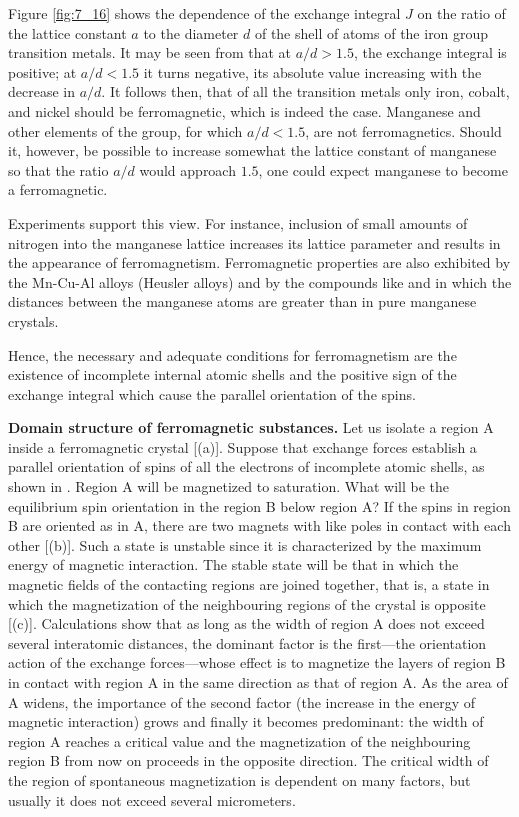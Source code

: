 Figure \ref{fig:7_16} shows the dependence of the exchange integral $J$ on the ratio of the lattice constant $a$ to the diameter $d$ of the  shell of atoms of the iron group transition metals. It may be seen from  that at $a/d>1.5$, the exchange integral is positive; at $a/d<1.5$ it turns negative, its absolute value increasing with the decrease in $a/d$. It follows then, that of all the transition metals only iron, cobalt, and nickel should be ferromagnetic, which is indeed the case. Manganese and other elements of the group, for which $a/d<1.5$, are not ferromagnetics. Should it, however, be possible to increase somewhat the lattice constant of manganese so that the ratio $a/d$ would approach $1.5$, one could expect manganese to become a ferromagnetic.

Experiments support this view. For instance, inclusion of small amounts of nitrogen into the manganese lattice increases its lattice parameter and results in the appearance of ferromagnetism. Ferromagnetic properties are also exhibited by the Mn-Cu-Al alloys (Heusler alloys) and by the compounds like  and  in which the distances between the manganese atoms are greater than in pure manganese crystals.

Hence, the necessary and adequate conditions for ferromagnetism are the existence of incomplete internal atomic shells and the positive sign of the exchange integral which cause the parallel orientation of the spins.

\textbf{Domain structure of ferromagnetic substances.} Let us isolate a region A inside a ferromagnetic crystal [(a)]. Suppose
that exchange forces establish a parallel orientation of spins of all the electrons of incomplete atomic shells, as shown in . Region A will be magnetized to saturation. What will be the equilibrium spin orientation in the region B below region A? If the spins in region B are oriented as in A, there are two magnets with like poles in contact with each other [(b)]. Such a state is unstable since it is characterized by the maximum energy of magnetic interaction. The stable state will be that in which the magnetic fields of the contacting regions are joined together, that is, a state in which the magnetization of the neighbouring regions of the crystal is opposite [(c)]. Calculations show that as long as the width of region A does not exceed several interatomic distances, the dominant factor is the first---the orientation action of the exchange forces---whose effect is to magnetize the layers of region B in contact with region A in the same direction as that of region A. As the area of A widens, the importance of the second factor (the increase in the energy of magnetic interaction) grows and finally it becomes predominant: the width of region A reaches a critical value and the magnetization of the neighbouring region B from now on proceeds in the opposite direction. The critical width of the region of spontaneous magnetization is dependent on many factors, but usually it does not exceed several micrometers.

